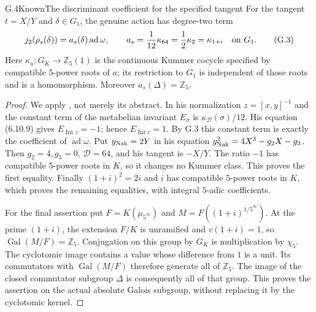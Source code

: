 \begin{statement}{G.4}{Known}{The discriminant coefficient for the specified tangent}
For the tangent $t=X/Y$ and $\delta\in G_1$, the genuine action has
degree-two term
\[
 j_2(\rho_s(\delta))=a_s(\delta)\operatorname{ad}\omega,
 \qquad
 a_s=\frac1{12}\kappa_{64}=\frac12\kappa_2=\kappa_{1+i}
 \quad\hbox{on }G_1.                                    \tag{G.3}
\]
Here $\kappa_a:G_K\to\mathbb Z_5(1)$ is the continuous Kummer
cocycle specified by compatible $5$-power roots of $a$; its restriction
to $G_1$ is independent of those roots and is a homomorphism.
Moreover $a_s(\Delta)=\mathbb Z_5$.
\end{statement}
\begin{proof}
We apply \citet[Theorem 6.10.3]{Nakamura2013Eisenstein}, not merely its
abstract. In his normalization $z=[x,y]^{-1}$ and the constant term of
the metabelian invariant $E_\sigma$ is $\kappa_{\mathcal D}(\sigma)/12$.
His equation (6.10.9) gives $E_{\operatorname{Int}z}=-1$; hence
$E_{\operatorname{Int}c}=1$. By G.3 this constant term is exactly the
coefficient of $\operatorname{ad}\omega$. Put $y_{\rm Nak}=2Y$ in his
equation $y_{\rm Nak}^2=4X^3-g_2X-g_3$. Then $g_2=4,g_3=0$,
$\mathcal D=64$, and his tangent is $-X/Y$. The ratio $-1$ has compatible
$5$-power roots in $K$, so it changes no Kummer class. This proves the
first equality. Finally $(1+i)^2=2i$ and $i$ has compatible $5$-power
roots in $K$, which proves the remaining equalities, with integral
$5$-adic coefficients.

For the final assertion put $F=K(\mu_{5^\infty})$ and
$M=F((1+i)^{1/5^\infty})$. At the prime $(1+i)$, the extension $F/K$
is unramified and $v(1+i)=1$, so $\operatorname{Gal}(M/F)=\mathbb Z_5$.
Conjugation on this group by $G_K$ is multiplication by $\chi_5$.
The cyclotomic image contains a value whose difference from $1$ is a
unit. Its commutators with $\operatorname{Gal}(M/F)$ therefore generate
all of $\mathbb Z_5$. The image of the closed commutator subgroup
$\Delta$ is consequently all of that group. This proves the assertion
on the actual absolute Galois subgroup, without replacing it by the
cyclotomic kernel.
\end{proof}

